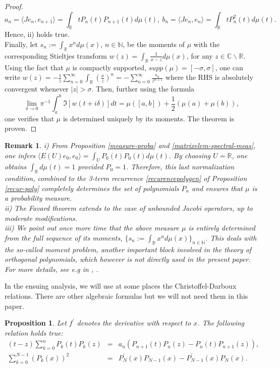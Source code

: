 \documentclass[a4paper]{jpconf}
\numberwithin{equation}{section}
\newtheorem{proposition}[Theorem]{Proposition}
\newtheorem{remark}[Theorem]{Remark}
\theoremstyle{nonumberplain}
\newtheorem{proof}{Proof}
\begin{document}
\begin{proof}
\begin{equation}
a_n=\langle Je_n,e_{n+1} \rangle=\int_\mathbb{R}tP_n(t)P_{n+1}(t)d\mu(t),\ b_n=\langle Je_n,e_n\rangle=\int_\mathbb{R}tP_n^2(t)d\mu(t). 
\end{equation}
Hence, ii) holds true. \\
Finally, let $s_n:=\int_\mathbb{R}x^nd\mu(x)$, $n\in\mathbb{N}$, be the moments of $\mu$ with the corresponding Stieltjes transform $w(z)=\int_\mathbb{R}\frac{1}{x-z}d\mu(x)$, for any $z\in\mathbb{C}\backslash\mathbb{R}$. Using the fact that $\mu$ is compactly supported, $supp(\mu)=[-\sigma,\sigma]$, one can write $w(z)=-\frac{1}{z}\sum_{n=0}^\infty\int_\mathbb{R}(\frac{x}{z})^n=-\sum_{n=0}^\infty\frac{s_n}{z^{n+1}}$ where the RHS is absolutely convergent whenever $|z|>\sigma$. Then, further using the formula 
\begin{equation}
\lim_{\delta\to0}\pi^{-1}\int_a^b\Im[ w(t+i\delta)]dt=\mu([a,b])+\frac{1}{2}(\mu(a)+\mu(b)), 
\end{equation}
one verifies that $\mu$ is determined uniquely by its moments. The theorem is proven.
\end{proof}
\begin{remark}
i) From Proposition \ref{measure-proba} and \ref{matrixelem-spectral-meas}, one infers $\langle E(U)e_0,e_0 \rangle=\int_UP_0(t)P_0(t)d\mu(t)$. By choosing $U=\mathbb{R}$, one obtains $\int_\mathbb{R}d\mu(t)=1$ provided $P_0=1$. Therefore, this last normalization condition, combined to the 3-term recurrence \eqref{recurencepolygen} of Proposition \ref{recur-poly} completely determines the set of polynomials $P_n$ and ensures that $\mu$ is a probability measure.\\
ii) The Favard theorem extends to the case of unbounded Jacobi operators, up to moderate modifications.\\
iii) We point out once more time that the above measure $\mu$ is entirely determined from the full sequence of its moments, $\{s_n:=\int_\mathbb{R}x^nd\mu(x) \}_{n\in\mathbb{N}}$. This deals with the so-called moment problem, another important block involved in the theory of orthogonal polynomials, which however is not directly used in the present paper. For more details, see e.g in \cite{akhiez:1965}, \cite{bsimon}.
\end{remark}
In the ensuing analysis, we will use at some places the Christoffel-Darboux relations. There are other algebraic formulas but we will not need them in this paper.
\begin{proposition}\label{chris-darb-rel}
Let $f^\prime$ denotes the derivative with respect to $x$. The following relation holds true: 
\begin{eqnarray}
(t-z)\sum_{k=0}^nP_k(t)P_k(z)&=&a_n(P_{n+1}(t)P_{n}(z)-P_{n}(t)P_{n+1}(z)),\label{christof-darb}\\
\sum_{k=0}^{N-1}(P_k(x))^2&=&P^\prime_N(x)P_{N-1}(x)-P^\prime_{N-1}(x)P_N(x)\label{christoff-darb2}.
\end{eqnarray}
\end{proposition}
\end{document}

